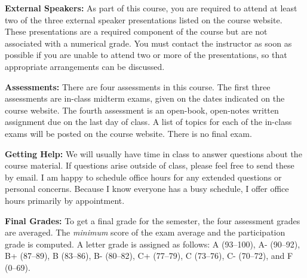 \documentclass[11pt, a4paper]{article}
\begin{document}
\bigskip

\textbf{External Speakers:}
As part of this course, you are required to attend at least two of the three external speaker presentations listed on the course website. These presentations are a required component of the course but are not associated with a numerical grade. You must contact the instructor as soon as possible if you are unable to attend two or more of the presentations, so that appropriate arrangements can be discussed.

\bigskip

\textbf{Assessments:}
There are four assessments in this course. The first three assessments are in-class midterm exams, given on the dates indicated on the course website. The fourth assessment is an open-book, open-notes written assignment due on the last day of class. A list of topics for each of the in-class exams will be posted on the course website. There is no final exam.

\bigskip

\textbf{Getting Help:}
We will usually have time in class to answer questions about the course
material. If questions arise outside of class, please feel free to send
these by email. I am happy to schedule office hours for any extended questions
or personal concerns. Because I know everyone has a busy schedule, I offer
office hours primarily by appointment.

\bigskip

\textbf{Final Grades:}
To get a final grade for the semester, the four assessment grades are averaged. The \textit{minimum} score of the exam average and the participation grade is
computed. A letter grade is assigned as follows:
             A (93--100), A- (90--92),
B+ (87--89), B (83--86),  B- (80--82),
C+ (77--79), C (73--76),  C- (70--72), and F (0--69).
\end{document}
